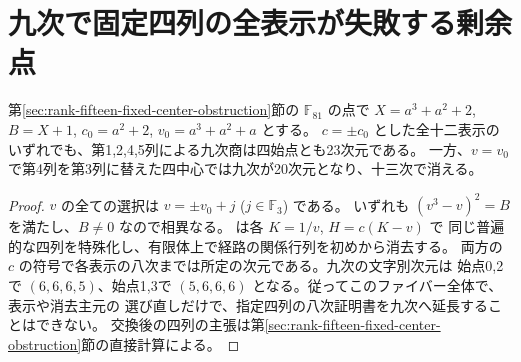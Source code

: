 \section{九次で固定四列の全表示が失敗する剰余点}
\label{sec:rank-fifteen-ninth-orbit-obstruction}
\begin{proposition}
第\ref{sec:rank-fifteen-fixed-center-obstruction}節の $\mathbb F_{81}$ の点で
$X=a^3+a^2+2$, $B=X+1$, $c_0=a^2+2$, $v_0=a^3+a^2+a$ とする。
$c=\pm c_0$ とした全十二表示のいずれでも、第1,2,4,5列による九次商は四始点とも23次元である。
一方、$v=v_0$ で第4列を第3列に替えた四中心では九次が20次元となり、十三次で消える。
\end{proposition}
\begin{proof}
$v$ の全ての選択は $v=\pm v_0+j$ ($j\in\mathbb F_3$) である。
いずれも $(v^3-v)^2=B$ を満たし、$B\ne0$ なので相異なる。
 は各 $K=1/v$, $H=c(K-v)$ で
同じ普遍的な四列を特殊化し、有限体上で経路の関係行列を初めから消去する。
両方の $c$ の符号で各表示の八次までは所定の次元である。九次の文字別次元は
始点0,2で $(6,6,6,5)$、始点1,3で $(5,6,6,6)$ となる。従ってこのファイバー全体で、表示や消去主元の
選び直しだけで、指定四列の八次証明書を九次へ延長することはできない。
交換後の四列の主張は第\ref{sec:rank-fifteen-fixed-center-obstruction}節の直接計算による。
\end{proof}
